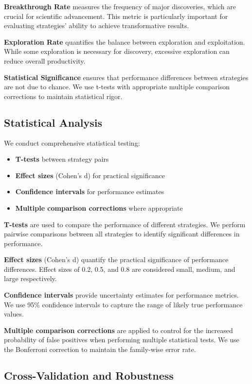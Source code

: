 \documentclass[letterpaper]{article}
\begin{document}
\textbf{Breakthrough Rate} measures the frequency of major discoveries, which are crucial for scientific advancement. This metric is particularly important for evaluating strategies' ability to achieve transformative results.

\textbf{Exploration Rate} quantifies the balance between exploration and exploitation. While some exploration is necessary for discovery, excessive exploration can reduce overall productivity.

\textbf{Statistical Significance} ensures that performance differences between strategies are not due to chance. We use t-tests with appropriate multiple comparison corrections to maintain statistical rigor.

\subsection{Statistical Analysis}

We conduct comprehensive statistical testing:
\begin{itemize}
\item \textbf{T-tests} between strategy pairs
\item \textbf{Effect sizes} (Cohen's d) for practical significance
\item \textbf{Confidence intervals} for performance estimates
\item \textbf{Multiple comparison corrections} where appropriate
\end{itemize}

\textbf{T-tests} are used to compare the performance of different strategies. We perform pairwise comparisons between all strategies to identify significant differences in performance.

\textbf{Effect sizes} (Cohen's d) quantify the practical significance of performance differences. Effect sizes of 0.2, 0.5, and 0.8 are considered small, medium, and large respectively.

\textbf{Confidence intervals} provide uncertainty estimates for performance metrics. We use 95\% confidence intervals to capture the range of likely true performance values.

\textbf{Multiple comparison corrections} are applied to control for the increased probability of false positives when performing multiple statistical tests. We use the Bonferroni correction to maintain the family-wise error rate.

\subsection{Cross-Validation and Robustness}
\end{document}
